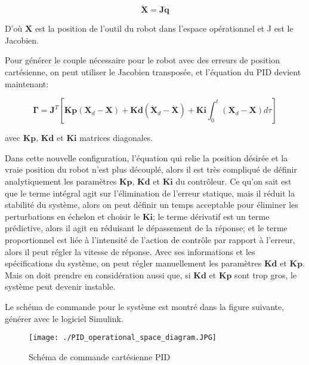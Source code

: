 \begin{equation}
	\dot{\bm{X}}=\bm{J}\dot{\bm{q}}
\end{equation}


D'où $ \bm{X} $ est la position de l'outil du robot dans l'espace opérationnel et J est le Jacobien.

Pour générer le couple nécessaire pour le robot avec des erreurs de position cartésienne, on peut utiliser le Jacobien transposée, et l'équation du PID devient maintenant:

	\begin{equation}
	\bm{\Gamma} = \bm{J}^T\left[\bm{Kp}(\bm{X}_d - \bm{X})+\bm{Kd}(\dot{\bm{X}}_d - \dot{\bm{X}}) +\bm{Ki}\int_0^t(\bm{X}_d - \bm{X})d\tau\right]
	\end{equation}


avec $ \bm{Kp} $, $ \bm{Kd} $ et $ \bm{Ki} $ matrices diagonales.

Dans cette nouvelle configuration, l'équation qui relie la position désirée et la vraie position du robot n'est plus découplé, alors il est très compliqué de définir analytiquement les paramètres $ \bm{Kp} $, $ \bm{Kd} $  et $ \bm{Ki} $ du contrôleur. Ce qu'on sait est que le terme intégral agit sur l'élimination de l'erreur statique, mais il réduit la stabilité du système, alors on peut définir un temps acceptable pour éliminer les perturbations en échelon et choisir le $ \bm{Ki} $; le terme dérivatif est un terme prédictive, alors il agit en réduisant le dépassement de la réponse; et le terme proportionnel est liée à l'intensité de l'action de contrôle par rapport à l'erreur, alors il peut régler la vitesse de réponse. Avec ses informations et les spécifications du système, on peut régler manuellement les paramètres $ \bm{Kd} $ et $ \bm{Kp} $. Mais on doit prendre en considération aussi que, si $ \bm{Kd} $ et $ \bm{Kp} $ sont trop gros, le système peut devenir instable.

Le schéma de commande pour le système est montré dans la figure suivante, générer avec le logiciel Simulink.

\begin{figure}[H]
	\begin{center}	
		\texttt{[image: ./PID\_operational\_space\_diagram.JPG]}
		\caption{Schéma de commande cartésienne PID}
		\label{fig:PID_operational_space_diagram}
	\end{center}
\end{figure}


